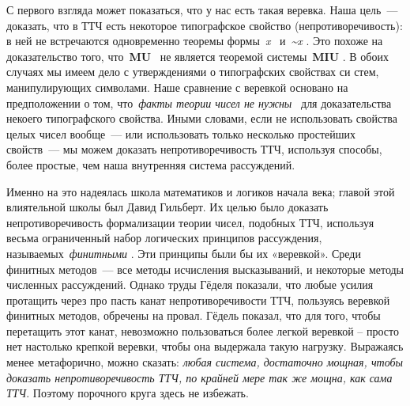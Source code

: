\documentclass[../main.tex]{subfiles}
\begin{document}
С первого взгляда может показаться, что у нас есть такая веревка. Наша цель~--- доказать, что в ТТЧ есть некоторое типографское свойство (непротиворечивость): в ней не встречаются одновременно теоремы формы~\emph{x} ~и~\emph{\textasciitilde x} . Это похоже на доказательство того, что~\textbf{MU} ~не является теоремой системы~\textbf{MIU} . В обоих случаях мы имеем дело с утверждениями о типографских свойствах си стем, манипулирующих символами. Наше сравнение с веревкой основано на предположении о том, что~\emph{факты теории чисел не нужны} ~для доказательства некоего типографского свойства. Иными словами, если не использовать свойства целых чисел вообще~--- или использовать только несколько простейших свойств~--- мы можем доказать непротиворечивость ТТЧ, используя способы, более простые, чем наша внутренняя система рассуждений.

Именно на это надеялась школа математиков и логиков начала века; главой этой влиятельной школы был Давид Гильберт. Их целью было доказать непротиворечивость формализации теории чисел, подобных ТТЧ, используя весьма ограниченный набор логических принципов рассуждения, называемых~\emph{финитными} . Эти принципы были бы их «веревкой». Среди финитных методов~--- все методы исчисления высказываний, и некоторые методы численных рассуждений. Однако труды Гёделя показали, что любые усилия протащить через про пасть канат непротиворечивости ТТЧ, пользуясь веревкой финитных методов, обречены на провал. Гёдель показал, что для того, чтобы перетащить этот канат, невозможно пользоваться более легкой веревкой \--- просто нет настолько крепкой веревки, чтобы она выдержала такую нагрузку. Выражаясь менее метафорично, можно сказать: \emph{любая система, достаточно мощная, чтобы доказать непротиворечивость ТТЧ, по крайней мере так же мощна, как сама ТТЧ}. Поэтому порочного круга здесь не избежать.
\end{document}
